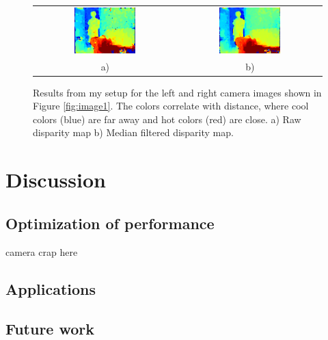 \documentclass[11pt,fleqn]{article}
\begin{document}
\begin{figure}[!h]
\begin{mdframed}
\centering
\setlength{}
\begin{tabular}{cc}
\includegraphics[width=0.45\textwidth]{images/res.png} &
\includegraphics[width=0.45\textwidth]{images/nomedres.png} \\[2pt]
a) & b) \\
\end{tabular}
\caption[Results from my setup]{Results from my setup for the left and right camera images shown in Figure \ref{fig:image1}. The colors correlate with distance, where cool colors (blue) are far away and hot colors (red) are close. a) Raw disparity map b) Median filtered disparity map.}
\label{fig:image2}
\end{mdframed}
\end{figure}

\section{Discussion}

\subsection{Optimization of performance}
camera crap here

\subsection{Applications}

\subsection{Future work}
\end{document}
